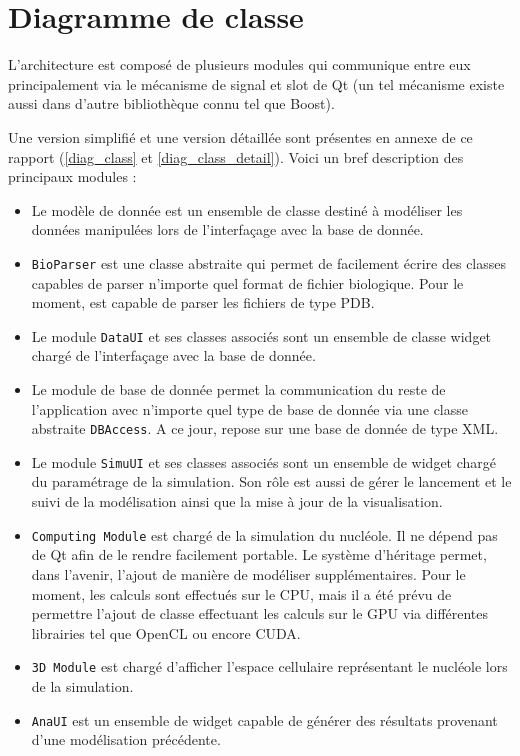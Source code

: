 \section{Diagramme de classe}

L'architecture est composé de plusieurs modules qui communique entre
eux principalement via le mécanisme de signal et slot de Qt (un tel
mécanisme existe aussi dans d'autre bibliothèque connu tel que Boost).

Une version simplifié et une version détaillée sont présentes en
annexe de ce rapport (\ref{diag_class} et
\ref{diag_class_detail}). Voici un bref description des principaux
modules :

\begin{itemize}
\item Le modèle de donnée est un ensemble de classe destiné à
  modéliser les données manipulées lors de l'interfaçage avec la base
  de donnée.
\item \texttt{BioParser} est une classe abstraite qui permet de
  facilement écrire des classes capables de parser n'importe quel
  format de fichier biologique. Pour le moment, \NQ est capable de
  parser les fichiers de type PDB.
\item Le module \texttt{DataUI} et ses classes associés sont un
  ensemble de classe widget chargé de l'interfaçage avec la base de
  donnée.
\item Le module de base de donnée permet la communication du reste de
  l'application avec n'importe quel type de base de donnée via une
  classe abstraite \texttt{DBAccess}. A ce jour, \NQ repose sur une
  base de donnée de type XML.
\item Le module \texttt{SimuUI} et ses classes associés sont un
  ensemble de widget chargé du paramétrage de la simulation. Son rôle
  est aussi de gérer le lancement et le suivi de la modélisation ainsi
  que la mise à jour de la visualisation.
\item \texttt{Computing Module} est chargé de la simulation du
  nucléole. Il ne dépend pas de Qt afin de le rendre facilement
  portable. Le système d'héritage permet, dans l'avenir, l'ajout de
  manière de modéliser supplémentaires. Pour le moment, les calculs
  sont effectués sur le CPU, mais il a été prévu de permettre l'ajout
  de classe effectuant les calculs sur le GPU via différentes
  librairies tel que OpenCL ou encore CUDA.
\item \texttt{3D Module} est chargé d'afficher l'espace cellulaire
  représentant le nucléole lors de la simulation.
\item \texttt{AnaUI} est un ensemble de widget capable de générer des
  résultats provenant d'une modélisation précédente.
\end{itemize}

